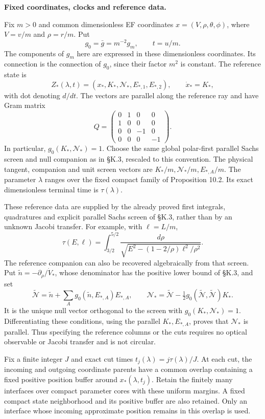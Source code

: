 \documentclass[
  english,
  11pt,
  reqno]{amsart}
\begin{document}
\textbf{Fixed coordinates, clocks and reference data.}

Fix \(m>0\) and common dimensionless EF coordinates
\(x=(V,\rho,\theta,\phi)\), where \(V=v/m\) and \(\rho=r/m\). Put \[
 g_0=\bar g=m^{-2}g_m,\qquad t=u/m.
\] The components of \(g_m\) here are expressed in these dimensionless
coordinates. Its connection is the connection of \(g_0\), since their
factor \(m^2\) is constant. The reference state is \[
 Z_*(\lambda,t)=(x_*,K_*,\mathcal N_*,E_{*,1},E_{*,2}),\qquad
 \dot x_*=K_*,
\] with dot denoting \(d/dt\). The vectors are parallel along the
reference ray and have Gram matrix \[
 Q=
 \begin{pmatrix}
 0&1&0&0\\1&0&0&0\\0&0&-1&0\\0&0&0&-1
 \end{pmatrix}.
\] In particular, \(g_0(K_*,\mathcal N_*)=1\). Choose the same global
polar-first parallel Sachs screen and null companion as in §K.3,
rescaled to this convention. The physical tangent, companion and unit
screen vectors are \(K_*/m,\mathcal N_*/m,E_{*,A}/m\). The parameter
\(\lambda\) ranges over the fixed compact family of Proposition 10.2.
Its exact dimensionless terminal time is \(\tau(\lambda)\).

These reference data are supplied by the already proved first integrals,
quadratures and explicit parallel Sachs screen of §K.3, rather than by
an unknown Jacobi transfer. For example, with \(\ell=L/m\), \[
 \tau(E,\ell)=\int_{3/2}^{5/2}
 \frac{d\rho}{\sqrt{E^2-(1-2/\rho)\ell^2/\rho^2}}.
\] The reference companion can also be recovered algebraically from that
screen. Put \(\widetilde n=-\partial_\rho/\dot V_*\), whose denominator
has the positive lower bound of §K.3, and set \[
 \widetilde{\mathcal N}=\widetilde n+
       \sum_Ag_0(\widetilde n,E_{*,A})E_{*,A},\qquad
 \mathcal N_*=\widetilde{\mathcal N}-\tfrac12g_0(\widetilde{\mathcal N},\widetilde{\mathcal N})K_*.
\] It is the unique null vector orthogonal to the screen with
\(g_0(K_*,\mathcal N_*)=1\). Differentiating these conditions, using the
parallel \(K_*,E_{*,A}\), proves that \(\mathcal N_*\) is parallel. Thus
specifying the reference columns or the cuts requires no optical
observable or Jacobi transfer and is not circular.

Fix a finite integer \(J\) and exact cut times
\(t_j(\lambda)=j\tau(\lambda)/J\). At each cut, the incoming and
outgoing coordinate parents have a common overlap containing a fixed
positive position buffer around \(x_*(\lambda,t_j)\). Retain the
finitely many interfaces over compact parameter cores with these uniform
margins. A fixed compact state neighborhood and its positive buffer are
also retained. Only an interface whose incoming approximate position
remains in this overlap is used.
\end{document}

